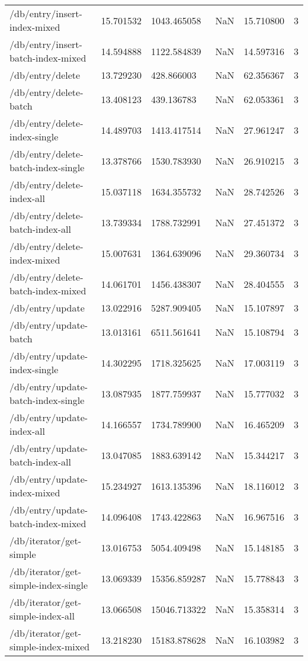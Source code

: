 \begin{tabularx}{\linewidth}{XXXXXX}
/db/entry/insert-index-mixed & 15.701532 & 1043.465058 & NaN & 15.710800 & 3 \\
/db/entry/insert-batch-index-mixed & 14.594888 & 1122.584839 & NaN & 14.597316 & 3 \\
/db/entry/delete & 13.729230 & 428.866003 & NaN & 62.356367 & 3 \\
/db/entry/delete-batch & 13.408123 & 439.136783 & NaN & 62.053361 & 3 \\
/db/entry/delete-index-single & 14.489703 & 1413.417514 & NaN & 27.961247 & 3 \\
/db/entry/delete-batch-index-single & 13.378766 & 1530.783930 & NaN & 26.910215 & 3 \\
/db/entry/delete-index-all & 15.037118 & 1634.355732 & NaN & 28.742526 & 3 \\
/db/entry/delete-batch-index-all & 13.739334 & 1788.732991 & NaN & 27.451372 & 3 \\
/db/entry/delete-index-mixed & 15.007631 & 1364.639096 & NaN & 29.360734 & 3 \\
/db/entry/delete-batch-index-mixed & 14.061701 & 1456.438307 & NaN & 28.404555 & 3 \\
/db/entry/update & 13.022916 & 5287.909405 & NaN & 15.107897 & 3 \\
/db/entry/update-batch & 13.013161 & 6511.561641 & NaN & 15.108794 & 3 \\
/db/entry/update-index-single & 14.302295 & 1718.325625 & NaN & 17.003119 & 3 \\
/db/entry/update-batch-index-single & 13.087935 & 1877.759937 & NaN & 15.777032 & 3 \\
/db/entry/update-index-all & 14.166557 & 1734.789900 & NaN & 16.465209 & 3 \\
/db/entry/update-batch-index-all & 13.047085 & 1883.639142 & NaN & 15.344217 & 3 \\
/db/entry/update-index-mixed & 15.234927 & 1613.135396 & NaN & 18.116012 & 3 \\
/db/entry/update-batch-index-mixed & 14.096408 & 1743.422863 & NaN & 16.967516 & 3 \\
/db/iterator/get-simple & 13.016753 & 5054.409498 & NaN & 15.148185 & 3 \\
/db/iterator/get-simple-index-single & 13.069339 & 15356.859287 & NaN & 15.778843 & 3 \\
/db/iterator/get-simple-index-all & 13.066508 & 15046.713322 & NaN & 15.358314 & 3 \\
/db/iterator/get-simple-index-mixed & 13.218230 & 15183.878628 & NaN & 16.103982 & 3 \\

\end{tabularx}
